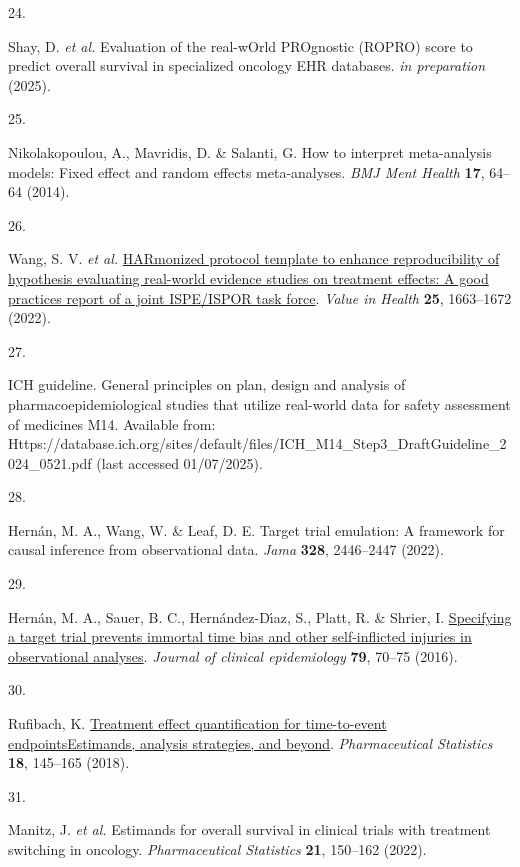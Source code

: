 \documentclass[
  letterpaper,
  DIV=11,
  numbers=noendperiod]{scrartcl}
\newlength{\cslhangindent}
\newlength{\csllabelwidth}
\newenvironment{CSLReferences}[2] %
 {\begin{list}{}{%
  \setlength{\itemindent}{0pt}
  \setlength{\leftmargin}{0pt}
  \setlength{\parsep}{0pt}
  \ifodd #1
   \setlength{\leftmargin}{\cslhangindent}
   \setlength{\itemindent}{-1\cslhangindent}
  \fi
  \setlength{\itemsep}{#2\baselineskip}}}
 {\end{list}}
\newcommand{\CSLLeftMargin}[1]{\parbox[t]{\csllabelwidth}{\strut#1\strut}}
\newcommand{\CSLRightInline}[1]{\parbox[t]{\linewidth - \csllabelwidth}{\strut#1\strut}}
\begin{document}
\begin{CSLReferences}{0}{0}
\CSLLeftMargin{24. }%
\CSLRightInline{Shay, D. \emph{et al.} Evaluation of the real-wOrld
PROgnostic (ROPRO) score to predict overall survival in specialized
oncology EHR databases. \emph{in preparation} (2025).}

\CSLLeftMargin{25. }%
\CSLRightInline{Nikolakopoulou, A., Mavridis, D. \& Salanti, G. How to
interpret meta-analysis models: Fixed effect and random effects
meta-analyses. \emph{BMJ Ment Health} \textbf{17}, 64--64 (2014).}

\CSLLeftMargin{26. }%
\CSLRightInline{Wang, S. V. \emph{et al.}
\href{https://doi.org/10.1016/j.jval.2022.09.001}{HARmonized protocol
template to enhance reproducibility of hypothesis evaluating real-world
evidence studies on treatment effects: A good practices report of a
joint ISPE/ISPOR task force}. \emph{Value in Health} \textbf{25},
1663--1672 (2022).}

\CSLLeftMargin{27. }%
\CSLRightInline{ICH guideline. General principles on plan, design and
analysis of pharmacoepidemiological studies that utilize real-world data
for safety assessment of medicines M14. Available from:
Https://database.ich.org/sites/default/files/ICH\_M14\_Step3\_DraftGuideline\_2024\_0521.pdf
(last accessed 01/07/2025). }

\CSLLeftMargin{28. }%
\CSLRightInline{Hernán, M. A., Wang, W. \& Leaf, D. E. Target trial
emulation: A framework for causal inference from observational data.
\emph{Jama} \textbf{328}, 2446--2447 (2022).}

\CSLLeftMargin{29. }%
\CSLRightInline{Hernán, M. A., Sauer, B. C., Hernández-Dı́az, S., Platt,
R. \& Shrier, I.
\href{https://doi.org/10.1016/j.jclinepi.2016.04.014}{Specifying a
target trial prevents immortal time bias and other self-inflicted
injuries in observational analyses}. \emph{Journal of clinical
epidemiology} \textbf{79}, 70--75 (2016).}

\CSLLeftMargin{30. }%
\CSLRightInline{Rufibach, K.
\href{https://doi.org/10.1002/pst.1917}{Treatment effect quantification
for time{-}to{-}event endpoints{\textendash}Estimands, analysis
strategies, and beyond}. \emph{Pharmaceutical Statistics} \textbf{18},
145--165 (2018).}

\CSLLeftMargin{31. }%
\CSLRightInline{Manitz, J. \emph{et al.} Estimands for overall survival
in clinical trials with treatment switching in oncology.
\emph{Pharmaceutical Statistics} \textbf{21}, 150--162 (2022).}


\end{CSLReferences}
\end{document}
